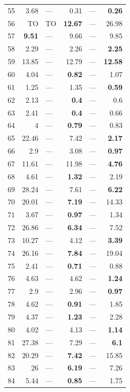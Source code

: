 \begin{longtable}{lr@{\hskip 4pt}l@{\hskip 12pt}r@{\hskip 4pt}l@{\hskip 12pt}r}
\midrule
55 & 3.68 & --- & 0.31 & --- & \textbf{0.26} \\
56 & TO & TO & \textbf{12.67} & --- & 26.98 \\
57 & \textbf{9.51} & --- & 9.66 & --- & 9.85 \\
58 & 2.29 & --- & 2.26 & --- & \textbf{2.25} \\
59 & 13.85 & --- & 12.79 & --- & \textbf{12.58} \\
\midrule
60 & 4.04 & --- & \textbf{0.82} & --- & 1.07 \\
61 & 1.25 & --- & 1.35 & --- & \textbf{0.59} \\
62 & 2.13 & --- & \textbf{0.4} & --- & 0.6 \\
63 & 2.41 & --- & \textbf{0.4} & --- & 0.66 \\
64 & 4 & --- & \textbf{0.79} & --- & 0.83 \\
65 & 22.46 & --- & 7.42 & --- & \textbf{2.17} \\
66 & 2.9 & --- & 3.08 & --- & \textbf{0.97} \\
67 & 11.61 & --- & 11.98 & --- & \textbf{4.76} \\
68 & 4.61 & --- & \textbf{1.32} & --- & 2.19 \\
69 & 28.24 & --- & 7.61 & --- & \textbf{6.22} \\
70 & 20.01 & --- & \textbf{7.19} & --- & 14.33 \\
71 & 3.67 & --- & \textbf{0.97} & --- & 1.34 \\
72 & 26.86 & --- & \textbf{6.34} & --- & 7.52 \\
73 & 10.27 & --- & 4.12 & --- & \textbf{3.39} \\
74 & 26.16 & --- & \textbf{7.84} & --- & 19.04 \\
75 & 2.41 & --- & \textbf{0.71} & --- & 0.88 \\
76 & 4.63 & --- & 4.62 & --- & \textbf{1.24} \\
77 & 2.9 & --- & 2.96 & --- & \textbf{0.97} \\
78 & 4.62 & --- & \textbf{0.91} & --- & 1.85 \\
79 & 4.37 & --- & \textbf{1.23} & --- & 2.28 \\
80 & 4.02 & --- & 4.13 & --- & \textbf{1.14} \\
81 & 27.38 & --- & 7.29 & --- & \textbf{6.1} \\
82 & 20.29 & --- & \textbf{7.42} & --- & 15.85 \\
83 & 26 & --- & \textbf{6.19} & --- & 7.26 \\
84 & 5.44 & --- & \textbf{0.85} & --- & 1.75 \\

\end{longtable}
